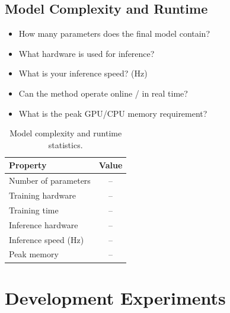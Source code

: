 \documentclass[letterpaper,10pt,conference]{ieeeconf}
\begin{document}
\subsection{Model Complexity and Runtime}

\begin{itemize}
    \item How many parameters does the final model contain?
   
    \item What hardware is used for inference?

    \item What is your inference speed? (Hz)
  
    \item Can the method operate online / in real time?
    \item What is the peak GPU/CPU memory requirement?
\end{itemize}

\begin{table}[htbp]
    \centering
    \footnotesize
     \caption{Model complexity and runtime statistics.}
    \begin{tabular}{lc}
        \toprule
        Property & Value \\
        \midrule
        Number of parameters & -- \\
        Training hardware & -- \\
        Training time & -- \\
        Inference hardware & -- \\
        Inference speed (Hz) & -- \\
        Peak memory & -- \\
        \bottomrule
    \end{tabular}
   
    \label{tab:runtime}
\end{table}


\section{Development Experiments}
\label{sec:devexp}
\end{document}
